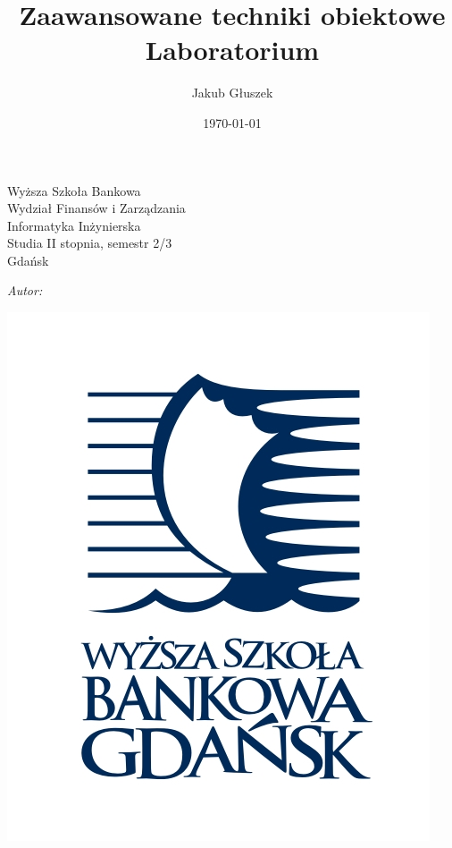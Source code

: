 \author{
	Jakub Głuszek\\
}
\title{Zaawansowane techniki obiektowe\\Laboratorium}
\date{\today}


\makeatletter
\newcommand{\linia}{\rule{\linewidth}{0.4mm}}
\renewcommand{\maketitle}{\begin{titlepage}
		\vspace*{1cm}
		\begin{center}\large
			Wyższa Szkoła Bankowa\\
			Wydział Finansów i Zarządzania\\
			Informatyka Inżynierska\\
			Studia II stopnia, semestr 2/3\\
			Gdańsk
		\end{center}
		\vspace{3cm}
		\noindent
		\begin{center}
			\Huge \textbf{\textsc{\@title}}
		\end{center}
		\vspace{0.5cm}
		\begin{center}
			\Large \version
		\end{center}		
		\vspace{1cm}
		\begin{flushright}
			\begin{minipage}{5cm}
				\textit{\small Autor:}\\
				\normalsize \textsc{\@author} \par
			\end{minipage}
			\vspace{1cm}
		\end{flushright}
		
		\begin{center}
			\includegraphics[width=.4\linewidth]{images/logo}
		\end{center}
		
		\vspace*{\stretch{6}}
		\begin{center}
			\Large\@date
		\end{center}
	\end{titlepage}%
}

\begin{titlepage}
	\maketitle
\end{titlepage}
